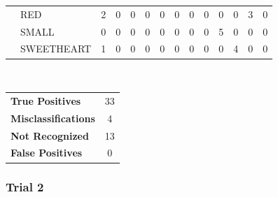\documentclass[12pt]{article}
\begin{document}
\begin{table}[h]
\begin{tabular}{ll|c|c|c|c|c|c|c|c|c|c|c|c|}
\multicolumn{1}{|l}{}          & \multicolumn{1}{|l|}{RED}        & 2   & 0   & 0         & 0     & 0    & 0      & 0     & 0   & 0     & 0          & 3              & 0              \\ \cline{2-14} 
\multicolumn{1}{|l}{}          & \multicolumn{1}{|l|}{SMALL}      & 0   & 0   & 0         & 0     & 0    & 0      & 0     & 0   & 5     & 0          & 0              & 0              \\ \cline{2-14} 
\multicolumn{1}{|l}{}          & \multicolumn{1}{|l|}{SWEETHEART} & 1   & 0   & 0         & 0     & 0    & 0      & 0     & 0   & 0     & 4          & 0              & 0              \\ \hline
\end{tabular}
\\
\begin{tabular}{l c}

\textbf{True Positives} & 33 \\
\textbf{Misclassifications} & 4 \\
\textbf{Not Recognized} & 13 \\
\textbf{False Positives} & 0 \\

\end{tabular}
\end{table}

\newpage
\subsubsection*{Trial 2}
\end{document}
